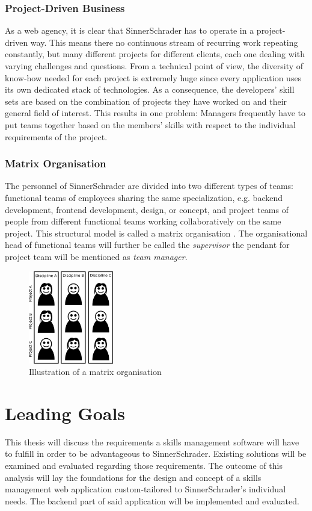 \subsubsection{Project-Driven Business}
As a web agency, it is clear that SinnerSchrader has to operate in a project-driven way. This means there no continuous stream of recurring work repeating constantly, but many different projects for different clients, each one dealing with varying challenges and questions. From a technical point of view, the diversity of know-how needed for each project is extremely huge since every application uses its own dedicated stack of technologies. As a consequence, the developers’ skill sets are based on the combination of projects they have worked on and their general field of interest. This results in one problem: Managers frequently have to put teams together based on the members’ skills with respect to the individual requirements of the project.

\subsubsection{Matrix Organisation}
The personnel of SinnerSchrader are divided into two different types of teams: functional teams of
employees sharing the same specialization, e.g. backend development, frontend development, design, or concept, and project teams of people from different functional teams working collaboratively on the same project. This structural model is called a matrix organisation \cite[P. 75]{BWL}.
The organisational head of functional teams will further be called the \textit{supervisor} the pendant for project team will be mentioned as \textit{team manager}.

\begin{figure}[!htp]
    \centering
    \includegraphics[width=0.33\textwidth]{images/matrixorga.png}
    \caption[Matrix Organisation]{Illustration of a matrix organisation}
    \label{fig:matrixorga}
\end{figure}



\section{Leading Goals}
This thesis will discuss the requirements a skills management software will have to fulfill in order to be advantageous to SinnerSchrader. Existing solutions will be examined and evaluated regarding those requirements. The outcome of this analysis will lay the foundations for the design and concept of a skills management web application custom-tailored to SinnerSchrader's individual needs. The backend part of said application will be implemented and evaluated.
